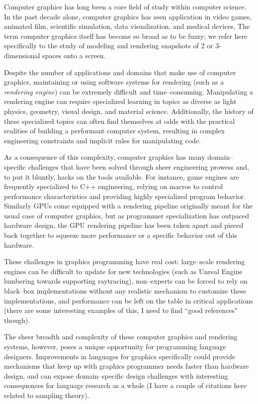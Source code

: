 
Computer graphics has long been a core field of study within computer science.  In the past decade alone, computer graphics has seen application in video games, animated film, scientific simulation, data visualization, and medical devices.  The term computer graphics itself has become so broad as to be fuzzy; we refer here specifically to the study of modeling and rendering snapshots of 2 or 3-dimensional spaces onto a screen.

Despite the number of applications and domains that make use of computer graphics, maintaining or using software systems for rendering (such as a \emph{rendering engine}) can be extremely difficult and time--consuming.  Manipulating a rendering engine can require specialized learning in topics as diverse as light physics, geometry, visual design, and material science.  Additionally, the history of these specialized topics can often find themselves at odds with the practical realities of building a performant computer system, resulting in complex engineering constraints and implicit rules for manipulating code.

As a consequence of this complexity, computer graphics has many domain--specific challenges that have been solved through sheer engineering prowess and, to put it bluntly, hacks on the tools available.  For instance, game engines are frequently specialized to C++ engineering, relying on macros to control performance characteristics and providing highly specialized program behavior.  Similarly GPUs come equipped with a rendering pipeline originally meant for the usual case of computer graphics, but as programmer specialization has outpaced hardware design, the GPU rendering pipeline has been taken apart and pieced back together to squeeze more performance or a specific behavior out of this hardware.

These challenges in graphics programming have real cost: large--scale rendering engines can be difficult to update for new technologies (such as Unreal Engine lumbering towards supporting raytracing), non--experts can be forced to rely on black--box implementations without any realistic mechanism to customize these implementations, and performance can be left on the table in critical applications (there are some interesting examples of this, I need to find ``good references" though).

The sheer breadth and complexity of these computer graphics and rendering systems, however, poses a unique opportunity for programming language designers.  Improvements in languages for graphics specifically could provide mechanisms that keep up with graphics programmer needs faster than hardware design, and can expose domain--specific design challenges with interesting consequences for language research as a whole (I have a couple of citations here related to sampling theory).

